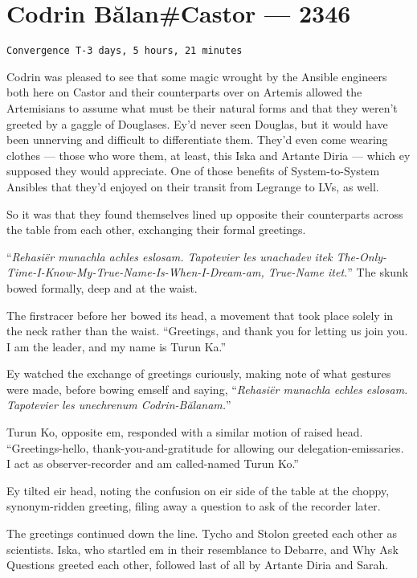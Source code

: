 \hypertarget{codrin-bux103lancastor-2346}{%
\chapter{Codrin Bălan\#Castor — 2346}\label{codrin-bux103lancastor-2346}}

\begin{verbatim}
Convergence T-3 days, 5 hours, 21 minutes
\end{verbatim}

Codrin was pleased to see that some magic wrought by the Ansible engineers both here on Castor and their counterparts over on Artemis allowed the Artemisians to assume what must be their natural forms and that they weren't greeted by a gaggle of Douglases. Ey'd never seen Douglas, but it would have been unnerving and difficult to differentiate them. They'd even come wearing clothes — those who wore them, at least, this Iska and Artante Diria — which ey supposed they would appreciate. One of those benefits of System-to-System Ansibles that they'd enjoyed on their transit from Legrange to LVs, as well.

So it was that they found themselves lined up opposite their counterparts across the table from each other, exchanging their formal greetings.

``\emph{Rehasiër munachla achles eslosam. Tapotevier les unachadev itek The-Only-Time-I-Know-My-True-Name-Is-When-I-Dream-am, True-Name itet.}'' The skunk bowed formally, deep and at the waist.

The firstracer before her bowed its head, a movement that took place solely in the neck rather than the waist. ``Greetings, and thank you for letting us join you. I am the leader, and my name is Turun Ka.''

Ey watched the exchange of greetings curiously, making note of what gestures were made, before bowing emself and saying, ``\emph{Rehasiër munachla echles eslosam. Tapotevier les unechrenum Codrin-Bălanam.}''

Turun Ko, opposite em, responded with a similar motion of raised head. ``Greetings-hello, thank-you-and-gratitude for allowing our delegation-emissaries. I act as observer-recorder and am called-named Turun Ko.''

Ey tilted eir head, noting the confusion on eir side of the table at the choppy, synonym-ridden greeting, filing away a question to ask of the recorder later.

The greetings continued down the line. Tycho and Stolon greeted each other as scientists. Iska, who startled em in their resemblance to Debarre, and Why Ask Questions greeted each other, followed last of all by Artante Diria and Sarah.

